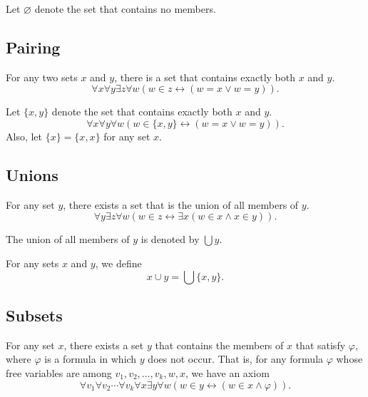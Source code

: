 \documentclass[11pt]{article}
\begin{document}
\begin{definition}
  Let $\varnothing$ denote the set that contains no members.
\end{definition}

\subsection{Pairing}
\begin{axiom}[Pairing]
  For any two sets $x$ and $y$, there is a set that contains exactly both $x$ and $y$.
  \begin{equation*}
    \forall x \forall y \exists z \forall w (w \in z \leftrightarrow (w = x \vee w = y)).
  \end{equation*}
\end{axiom}

\begin{definition}
  Let $\{x, y\}$ denote the set that contains exactly both $x$ and $y$.
  \begin{equation*}
    \forall x \forall y \forall w (w \in \{x, y\} \leftrightarrow (w = x \vee w = y)).
  \end{equation*}
  Also, let $\{x\} = \{x, x\}$ for any set $x$.
\end{definition}

\subsection{Unions}
\begin{axiom}[Union]
  For any set $y$, there exists a set that is the union of all members of $y$.
  \begin{equation*}
    \forall y \exists z \forall w (w \in z \leftrightarrow \exists x (w \in x \wedge x \in y)).
  \end{equation*}
\end{axiom}

\begin{definition}
  The union of all members of $y$ is denoted by $\bigcup y$.
\end{definition}

\begin{definition}
  For any sets $x$ and $y$, we define
  \begin{equation*}
    x \cup y = \bigcup \{x, y\}.
  \end{equation*}
\end{definition}

\subsection{Subsets}
\begin{axiomschema}[Separation]
  For any set $x$, there exists a set $y$ that contains the members of $x$ that satisfy $\varphi$, where $\varphi$ is a formula in which $y$ does not occur.
  That is, for any formula $\varphi$ whose free variables are among $v_1, v_2, \dots, v_k, w, x$, we have an axiom
  \begin{equation*}
    \forall v_1 \forall v_2 \cdots \forall v_k \forall x \exists y \forall w (w \in y \leftrightarrow (w \in x \wedge \varphi)).
  \end{equation*}
\end{axiomschema}
\end{document}
